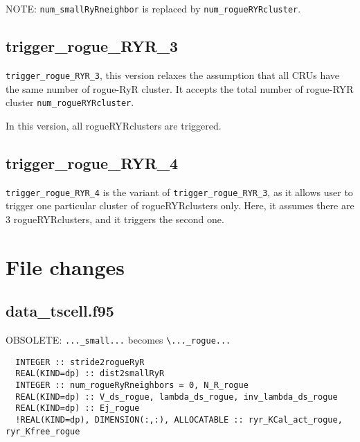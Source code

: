 NOTE: \verb!num_smallRyRneighbor! is replaced by \verb!num_rogueRYRcluster!.


\subsection{trigger\_rogue\_RYR\_3}

\verb!trigger_rogue_RYR_3!, this version relaxes the assumption that all CRUs
have the same number of rogue-RyR cluster. It accepts the total number of
rogue-RYR cluster \verb!num_rogueRYRcluster!.

In this version, all rogueRYRclusters are triggered.

\subsection{trigger\_rogue\_RYR\_4}

\verb!trigger_rogue_RYR_4! is the variant of \verb!trigger_rogue_RYR_3!, as it
allows user to trigger one particular cluster of rogueRYRclusters only. Here, it
assumes there are 3 rogueRYRclusters, and it triggers the second one. 

\section{File changes}
\label{sec:rogueRyR_filechanges}

\subsection{data\_tscell.f95}
\label{sec:data_tscell}

OBSOLETE: \verb!..._small...! becomes \verb!\..._rogue...!

\begin{verbatim}
  INTEGER :: stride2rogueRyR
  REAL(KIND=dp) :: dist2smallRyR
  INTEGER :: num_rogueRyRneighbors = 0, N_R_rogue
  REAL(KIND=dp) :: V_ds_rogue, lambda_ds_rogue, inv_lambda_ds_rogue
  REAL(KIND=dp) :: Ej_rogue
  !REAL(KIND=dp), DIMENSION(:,:), ALLOCATABLE :: ryr_KCal_act_rogue, ryr_Kfree_rogue
\end{verbatim}

